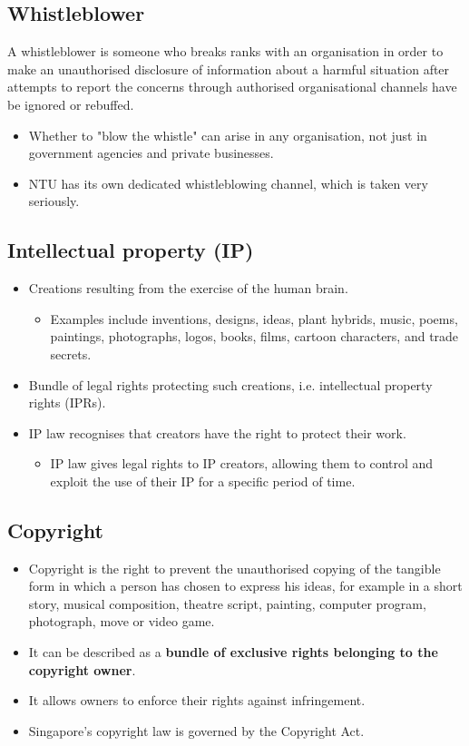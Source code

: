\documentclass[11pt]{article}
\begin{document}
\subsection{Whistleblower}
\label{sec:org3ab825b}
A whistleblower is someone who breaks ranks with an organisation in order to make an unauthorised disclosure of information about a harmful situation after attempts to report the concerns through authorised organisational channels have be ignored or rebuffed.
\begin{itemize}
\item Whether to "blow the whistle" can arise in any organisation, not just in government agencies and private businesses.
\item NTU has its own dedicated whistleblowing channel, which is taken very seriously.
\end{itemize}

\subsection{Intellectual property (IP)}
\label{sec:org1c1f1a2}
\begin{itemize}
\item Creations resulting from the exercise of the human brain.
\begin{itemize}
\item Examples include inventions, designs, ideas, plant hybrids, music, poems, paintings, photographs, logos, books, films, cartoon characters, and trade secrets.
\end{itemize}

\item Bundle of legal rights protecting such creations, i.e. intellectual property rights (IPRs).
\item IP law recognises that creators have the right to protect their work.
\begin{itemize}
\item IP law gives legal rights to IP creators, allowing them to control and exploit the use of their IP for a specific period of time.
\end{itemize}
\end{itemize}

\subsection{Copyright}
\label{sec:org3816518}
\begin{itemize}
\item Copyright is the right to prevent the unauthorised copying of the tangible form in which a person has chosen to express his ideas, for example in a short story, musical composition, theatre script, painting, computer program, photograph, move or video game.
\item It can be described as a \textbf{bundle of exclusive rights belonging to the copyright owner}.
\item It allows owners to enforce their rights against infringement.
\item Singapore's copyright law is governed by the Copyright Act.
\end{itemize}
\end{document}
